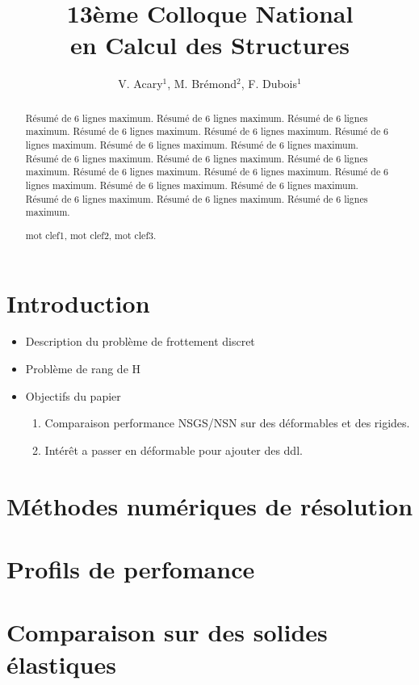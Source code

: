 \documentclass{CSMA2017}
\title{13ème Colloque National \\ en Calcul des Structures}
\author{V. Acary$^1$, M. Brémond$^2$, F. Dubois$^1$}
\begin{document}
\maketitle

\begin{abstract}
Résumé de 6 lignes maximum. Résumé de 6 lignes maximum. Résumé de 6 lignes maximum. Résumé de 6 lignes maximum. Résumé de 6 lignes maximum. Résumé de 6 lignes maximum. Résumé de 6 lignes maximum. Résumé de 6 lignes maximum. Résumé de 6 lignes maximum. Résumé de 6 lignes maximum. Résumé de 6 lignes maximum. Résumé de 6 lignes maximum. Résumé de 6 lignes maximum. Résumé de 6 lignes maximum. Résumé de 6 lignes maximum. Résumé de 6 lignes maximum. Résumé de 6 lignes maximum. Résumé de 6 lignes maximum. Résumé de 6 lignes maximum.

\keywords mot clef1, mot clef2, mot clef3.
\end{abstract}

\section{Introduction}

\begin{itemize}
\item Description du problème de frottement discret
\item Problème de rang de H
\item Objectifs du papier
  \begin{enumerate}
  \item Comparaison performance NSGS/NSN sur des déformables et des rigides.
  \item Intérêt a passer en déformable pour ajouter des ddl.
  \end{enumerate}
\end{itemize}

\section{Méthodes numériques de résolution}

\section{Profils de perfomance}

\section{Comparaison sur des solides élastiques}
\end{document}
